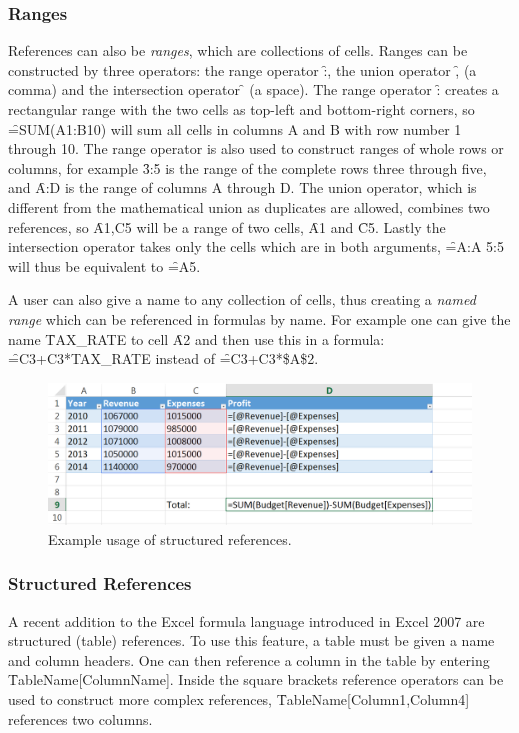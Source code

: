 \subsubsection{Ranges}
References can also be \emph{ranges}, which are collections of cells.
Ranges can be constructed by three operators: the range operator \f{:}, the union operator \f{,} (a comma) and the intersection operator \f{} (a space).
The range operator \f{:} creates a rectangular range with the two cells as top-left and bottom-right corners, so \f{=SUM(A1:B10)} will sum all cells in columns A and B with row number 1 through 10.
The range operator is also used to construct ranges of whole rows or columns, for example \f{3:5} is the range of the complete rows three through five, and \f{A:D} is the range of columns A through D.
The union operator, which is different from the mathematical union as duplicates are allowed, combines two references, so \f{A1,C5} will be a range of two cells, \f{A1} and \f{C5}.
Lastly the intersection operator takes only the cells which are in both arguments, \f{=A:A 5:5} will thus be equivalent to \f{=A5}.

A user can also give a name to any collection of cells, thus creating a \emph{named range} which can be referenced in formulas by name.
For example one can give the name \f{TAX\_RATE} to cell \f{A2} and then use this in a formula: \f{=C3+C3*TAX\_RATE} instead of \f{=C3+C3*\$A\$2}.

\begin{figure}
\centering
\includegraphics{anatomy/structuredreferences}
\caption{Example usage of structured references.}
\label{fig:structuredreferences}
\end{figure}

\subsubsection{Structured References}

A recent addition to the Excel formula language introduced in Excel 2007 are structured (table) references.
To use this feature, a table must be given a name and column headers.
One can then reference a column in the table by entering \f{TableName[ColumnName]}.
Inside the square brackets reference operators can be used to construct more complex references, \f{TableName[Column1,Column4]} references two columns.

